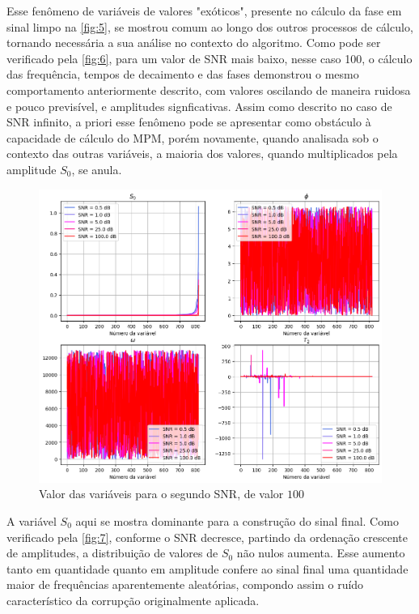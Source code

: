 \documentclass[12pt]{article}
\begin{document}
Esse fenômeno de variáveis de valores "exóticos", presente no cálculo da fase em sinal limpo na \autoref{fig:5}, se mostrou comum ao longo dos outros processos de 
cálculo, tornando necessária a sua análise no contexto do algoritmo. Como pode ser verificado pela \autoref{fig:6}, para um valor de SNR mais baixo, nesse caso 100, 
o cálculo das frequência, tempos de decaimento e das fases demonstrou o mesmo comportamento anteriormente descrito, com valores oscilando de maneira ruidosa e pouco 
previsível, e amplitudes signficativas. Assim como descrito no caso de SNR infinito, a priori esse fenômeno pode se apresentar como obstáculo à capacidade de cálculo 
do MPM, porém novamente, quando analisada sob o contexto das outras variáveis, a maioria dos valores, quando multiplicados pela amplitude $S_0$, se anula.

\begin{figure} [H]
    \centering
    \includegraphics[scale=0.625]{vars-total.png}
    \caption{Valor das variáveis para o segundo SNR, de valor $100$}
    \label{fig:7}
\end{figure}

A variável $S_0$ aqui se mostra dominante para a construção do sinal final. Como verificado pela \autoref{fig:7}, conforme o SNR decresce, partindo da ordenação 
crescente de amplitudes, a distribuição de valores de $S_0$ não nulos aumenta. Esse aumento tanto em quantidade quanto em amplitude confere ao sinal final uma 
quantidade maior de frequências aparentemente aleatórias, compondo assim o ruído característico da corrupção originalmente aplicada.
\end{document}
